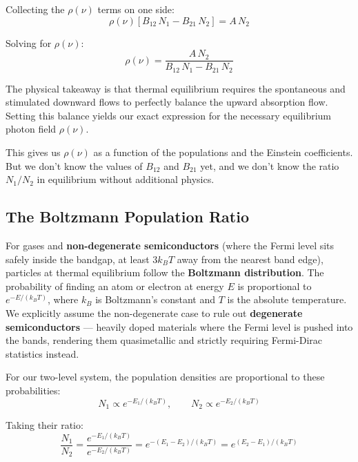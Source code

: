 Collecting the $\rho(\nu)$ terms on one side:
\begin{equation*}
    \rho(\nu)\left[B_{12}\,N_1 - B_{21}\,N_2\right] = A\,N_2
\end{equation*}

Solving for $\rho(\nu)$:
\begin{equation*}
    \rho(\nu) = \frac{A\,N_2}{B_{12}\,N_1 - B_{21}\,N_2}
\end{equation*}

The physical takeaway is that thermal equilibrium requires the spontaneous and stimulated downward flows to perfectly balance the upward absorption flow. Setting this balance yields our exact expression for the necessary equilibrium photon field $\rho(\nu)$.

This gives us $\rho(\nu)$ as a function of the populations and the Einstein coefficients. But we don't know the values of $B_{12}$ and $B_{21}$ yet, and we don't know the ratio $N_1/N_2$ in equilibrium without additional physics.

\subsection{The Boltzmann Population Ratio}

For gases and \textbf{non-degenerate semiconductors} (where the Fermi level sits safely inside the bandgap, at least $3k_BT$ away from the nearest band edge), particles at thermal equilibrium follow the \textbf{Boltzmann distribution}. The probability of finding an atom or electron at energy $E$ is proportional to $e^{-E/(k_B T)}$, where $k_B$ is Boltzmann's constant and $T$ is the absolute temperature. We explicitly assume the non-degenerate case to rule out \textbf{degenerate semiconductors} — heavily doped materials where the Fermi level is pushed into the bands, rendering them quasimetallic and strictly requiring Fermi-Dirac statistics instead.

For our two-level system, the population densities are proportional to these probabilities:
\begin{equation*}
    N_1 \propto e^{-E_1/(k_B T)}, \qquad N_2 \propto e^{-E_2/(k_B T)}
\end{equation*}

Taking their ratio:
\begin{equation*}
    \frac{N_1}{N_2} = \frac{e^{-E_1/(k_B T)}}{e^{-E_2/(k_B T)}} = e^{-(E_1 - E_2)/(k_B T)} = e^{(E_2 - E_1)/(k_B T)}
\end{equation*}


